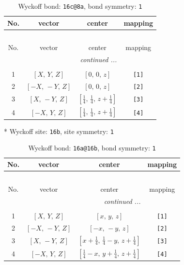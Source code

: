 \documentclass[fleqn,8pt]{jsarticle}
\begin{document}
\renewcommand{\arraystretch}{1.2}
\begin{longtable}{cccc}
\caption{Wyckoff bond: {\tt 16c@8a}, bond symmetry: {\tt 1}}
 \\
 \hline \hline
No. & vector & center & mapping \\ \hline \endfirsthead

\multicolumn{3}{l}{\tablename\ \thetable{}} \\
 \hline \hline
No. & vector & center & mapping \\ \hline \endhead

 \hline \hline
\multicolumn{3}{r}{\footnotesize\it continued ...} \\ \endfoot

 \hline \hline
\multicolumn{3}{r}{} \\ \endlastfoot

1 & $\left[ X,\, Y,\, Z \right]$ & $\left[ 0,\, 0,\, z \right]$ & {\tt [1]} \\ \hline
2 & $\left[ - X,\, - Y,\, Z \right]$ & $\left[ 0,\, 0,\, z \right]$ & {\tt [2]} \\ \hline
3 & $\left[ X,\, - Y,\, Z \right]$ & $\left[ \frac{1}{4},\, \frac{1}{4},\, z + \frac{1}{4} \right]$ & {\tt [3]} \\ \hline
4 & $\left[ - X,\, Y,\, Z \right]$ & $\left[ \frac{1}{4},\, \frac{1}{4},\, z + \frac{1}{4} \right]$ & {\tt [4]} \\
\end{longtable}
* Wyckoff site: {\tt 16b}, site symmetry: {\tt 1}
\renewcommand{\arraystretch}{1.2}
\begin{longtable}{cccc}
\caption{Wyckoff bond: {\tt 16a@16b}, bond symmetry: {\tt 1}}
 \\
 \hline \hline
No. & vector & center & mapping \\ \hline \endfirsthead

\multicolumn{3}{l}{\tablename\ \thetable{}} \\
 \hline \hline
No. & vector & center & mapping \\ \hline \endhead

 \hline \hline
\multicolumn{3}{r}{\footnotesize\it continued ...} \\ \endfoot

 \hline \hline
\multicolumn{3}{r}{} \\ \endlastfoot

1 & $\left[ X,\, Y,\, Z \right]$ & $\left[ x,\, y,\, z \right]$ & {\tt [1]} \\ \hline
2 & $\left[ - X,\, - Y,\, Z \right]$ & $\left[ - x,\, - y,\, z \right]$ & {\tt [2]} \\ \hline
3 & $\left[ X,\, - Y,\, Z \right]$ & $\left[ x + \frac{1}{4},\, \frac{1}{4} - y,\, z + \frac{1}{4} \right]$ & {\tt [3]} \\ \hline
4 & $\left[ - X,\, Y,\, Z \right]$ & $\left[ \frac{1}{4} - x,\, y + \frac{1}{4},\, z + \frac{1}{4} \right]$ & {\tt [4]} \\
\end{longtable}
\end{document}

